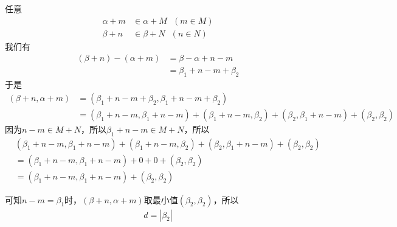 \documentclass{article}
\begin{document}
任意
\begin{align*}
  \alpha + m & \in \alpha + M \ \ \ (m \in M) \\
  \beta + n  & \in \beta + N \ \ \ (n \in N)
\end{align*}
我们有
\begin{align*}
  (\beta + n) - (\alpha + m)
   & = \beta - \alpha + n - m    \\
   & = \beta_1 + n - m + \beta_2
\end{align*}
于是
\begin{align*}
  (\beta + n, \alpha + m)
   & = (\beta_1 + n - m + \beta_2, \beta_1 + n - m + \beta_2)          \\
   & = (\beta_1 + n - m, \beta_1 + n - m) + (\beta_1 + n - m, \beta_2)
  + (\beta_2, \beta_1 + n - m) + (\beta_2, \beta_2)
\end{align*}
因为$n - m \in M + N$，所以$\beta_1 + n - m \in M + N$，所以
\begin{align*}
   & (\beta_1 + n - m, \beta_1 + n - m) + (\beta_1 + n - m, \beta_2)
  + (\beta_2, \beta_1 + n - m) + (\beta_2, \beta_2)                    \\
   & = (\beta_1 + n - m, \beta_1 + n - m) + 0 + 0 + (\beta_2, \beta_2) \\
   & = (\beta_1 + n - m, \beta_1 + n - m) + (\beta_2, \beta_2)
\end{align*}

可知$n - m = \beta_1$时，$(\beta + n, \alpha + m)$取最小值$(\beta_2, \beta_2)$，所以
\begin{align*}
  d = |\beta_2|
\end{align*}
\end{document}
